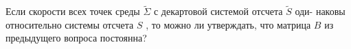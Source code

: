 Если скорости всех точек среды $\tilde\Sigma$ с декартовой системой отсчета $\tilde S$ оди-
наковы относительно системы отсчета $S$ , то можно ли утверждать, что
матрица $B$ из предыдущего вопроса постоянна?
